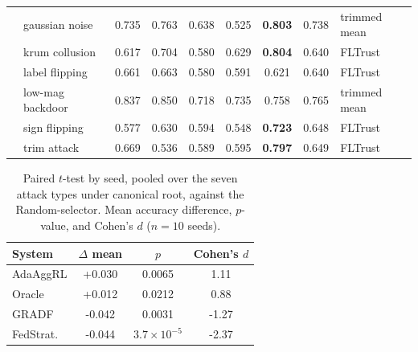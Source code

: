 \begin{table}[t]
\begin{tabular}{llccccccl}
 & gaussian noise & 0.735 & 0.763 & 0.638 & 0.525 & \textbf{0.803} & 0.738 & trimmed mean \\
 & krum collusion & 0.617 & 0.704 & 0.580 & 0.629 & \textbf{0.804} & 0.640 & FLTrust \\
 & label flipping & 0.661 & 0.663 & 0.580 & 0.591 & 0.621 & 0.640 & FLTrust \\
 & low-mag backdoor & 0.837 & 0.850 & 0.718 & 0.735 & 0.758 & 0.765 & trimmed mean \\
 & sign flipping & 0.577 & 0.630 & 0.594 & 0.548 & \textbf{0.723} & 0.648 & FLTrust \\
 & trim attack & 0.669 & 0.536 & 0.589 & 0.595 & \textbf{0.797} & 0.649 & FLTrust \\
\bottomrule
\end{tabular}
\end{table}

\begin{table}[t]
\centering
\caption{Paired $t$-test by seed, pooled over the seven attack types under canonical root, against the Random-selector. Mean accuracy difference, $p$-value, and Cohen's $d$ ($n=10$ seeds).}
\label{tab:pooled-vs-random}
\begin{tabular}{lccc}
\toprule
System & $\Delta$ mean & $p$ & Cohen's $d$ \\
\midrule
AdaAggRL & +0.030 & 0.0065 & 1.11 \\
Oracle & +0.012 & 0.0212 & 0.88 \\
GRADF & -0.042 & 0.0031 & -1.27 \\
FedStrat. & -0.044 & $3.7\times10^{-5}$ & -2.37 \\
\bottomrule
\end{tabular}
\end{table}

